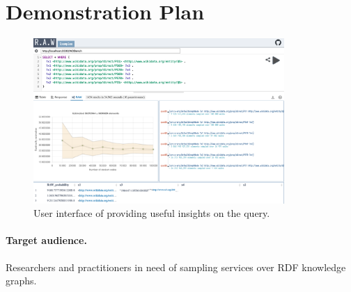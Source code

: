 




\section{Demonstration Plan}

\begin{figure}
  \centering
  \includegraphics[width=0.85\textwidth]{figures/raw_screenshot.png}
  \caption{\label{fig:raw_screenshot}User interface of \NAME providing useful insights on the query.}
\end{figure}

\paragraph{Target audience.}
Researchers and practitioners in need of sampling services over RDF
knowledge graphs. 

